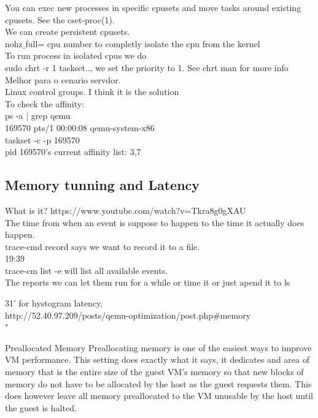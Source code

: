 \documentclass[11pt, a4paper, oneside]{article}
\theoremstyle{definition}
\begin{document}
You can exec new processes in specific cpusets and move tasks around existing cpusets. See the cset-proc(1).\\
We can create persistent cpusets.\\

nohz$\_$full= cpu number to completly isolate the cpu from the kernel\\

To run process in isolated cpus we do \\
sudo chrt -r 1 taskset.., we set the priority to 1. See chrt man for more info\\

Melhor para o cenario servdor.\\

Linux control groups. I think it is the solution\\

To check the affinity:\\
ps -a | grep qemu\\
 	169570 pts/1    00:00:08 qemu-system-x86\\
taskset -c -p 169570\\
	pid 169570's current affinity list: 3,7\\

\subsection{Memory tunning and Latency}
What is it? https://www.youtube.com/watch?v=Tkra8g0gXAU\\
The time from when an event is suppose to happen to the time it actually does happen.\\

trace-cmd record says we want to record it to a file.\\ 
19:39\\
trace-cm list -e will list all available events.\\

The reports we can let them run for a while or time it or just apend it to ls

31' for hystogram latency.\\

http://52.40.97.209/posts/qemu-optimization/post.php$\#$memory\\

"

Preallocated Memory
Preallocating memory is one of the easiest ways to improve VM performance. This setting does exactly what it says, it dedicates and area of memory that is the entire size of the guest VM's memory so that new blocks of memory do not have to be allocated by the host as the guest requests them. This does however leave all memory preallocated to the VM unusable by the host until the guest is halted.\\
\end{document}
